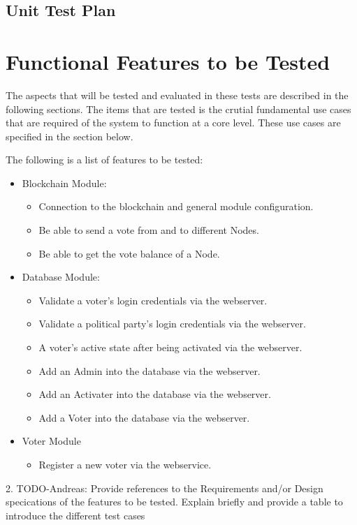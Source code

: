 \documentclass[11pt]{article}
\begin{document}
	\begin{center}
		\section*{Unit Test Plan}
	\end{center}
	
	\section{Functional Features to be Tested}
	\label{sec:FunctionalFeaturesToBeTested}
	The aspects that will be tested and evaluated in these tests are described in the following sections. The items that are tested is the crutial fundamental use cases that are required of the system to function at a core level. These use cases are specified in the section below.\newline
	
	The following is a list of features to be tested:
	\begin{itemize}
		\item Blockchain Module:
		\begin{itemize}
			\item Connection to the blockchain and general module configuration.
			\item Be able to send a vote from and to different Nodes.
			\item Be able to get the vote balance of a Node.
		\end{itemize}
		\item{Database Module:}
		\begin{itemize}
			\item Validate a voter's login credentials via the webserver.
			\item Validate a political party's login credentials via the webserver.
			\item A voter's active state after being activated via the webserver.
			\item Add an Admin into the database via the webserver.
			\item Add an Activater into the database via the webserver.
			\item Add a Voter into the database via the webserver.
		\end{itemize}
		\item{Voter Module}
		\begin{itemize}
			\item Register a new voter via the webservice.
		\end{itemize}
	\end{itemize}
	2. TODO-Andreas: Provide references to the Requirements and/or Design specications of the features to be tested. Explain briefly and provide a table to introduce the different test cases
	
\end{document}
